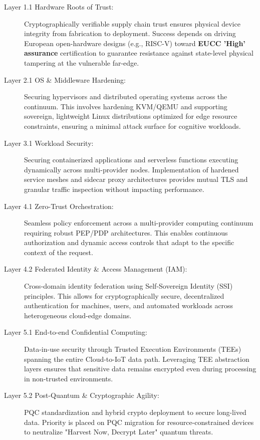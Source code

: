 \documentclass[12pt,a4paper]{report}
\begin{document}
\begin{description}
\item[Layer 1.1 Hardware Roots of Trust:] Cryptographically verifiable supply chain trust ensures physical device integrity from fabrication to deployment. Success depends on driving European open-hardware designs (e.g., RISC-V) toward \textbf{EUCC 'High' assurance} certification \cite{eucc} to guarantee resistance against state-level physical tampering at the vulnerable far-edge.

\item[Layer 2.1 OS \& Middleware Hardening:] Securing hypervisors and distributed operating systems across the continuum. This involves hardening KVM/QEMU and supporting sovereign, lightweight Linux distributions optimized for edge resource constraints, ensuring a minimal attack surface for cognitive workloads.

\item[Layer 3.1 Workload Security:] Securing containerized applications and serverless functions executing dynamically across multi-provider nodes. Implementation of hardened service meshes and sidecar proxy architectures provides mutual TLS and granular traffic inspection without impacting performance.

\item[Layer 4.1 Zero-Trust Orchestration:] Seamless policy enforcement across a multi-provider computing continuum requiring robust PEP/PDP architectures. This enables continuous authorization and dynamic access controls that adapt to the specific context of the request.

\item[Layer 4.2 Federated Identity \& Access Management (IAM):] Cross-domain identity federation using Self-Sovereign Identity (SSI) principles. This allows for cryptographically secure, decentralized authentication for machines, users, and automated workloads across heterogeneous cloud-edge domains.

\item[Layer 5.1 End-to-end Confidential Computing:] Data-in-use security through Trusted Execution Environments (TEEs) spanning the entire Cloud-to-IoT data path. Leveraging TEE abstraction layers ensures that sensitive data remains encrypted even during processing in non-trusted environments.

\item[Layer 5.2 Post-Quantum \& Cryptographic Agility:] PQC standardization and hybrid crypto deployment to secure long-lived data. Priority is placed on PQC migration for resource-constrained devices to neutralize "Harvest Now, Decrypt Later" quantum threats.


\end{description}
\end{document}
